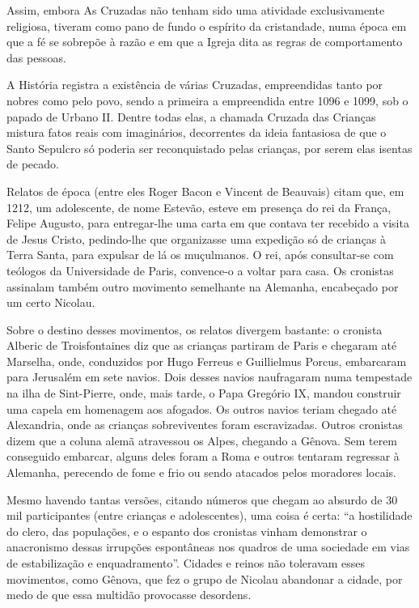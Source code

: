 \documentclass[12pt]{extarticle}
\begin{document}


Assim, embora As Cruzadas não tenham sido uma atividade exclusivamente
religiosa, tiveram como pano de fundo o espírito da cristandade, numa
época em que a fé se sobrepõe à razão e em que a Igreja dita as regras
de comportamento das pessoas.

A História registra a existência de várias Cruzadas, empreendidas tanto
por nobres como pelo povo, sendo a primeira a empreendida entre 1096 e
1099, sob o papado de Urbano II. Dentre todas elas, a chamada Cruzada
das Crianças mistura fatos reais com imaginários, decorrentes da ideia
fantasiosa de que o Santo Sepulcro só poderia ser reconquistado pelas
crianças, por serem elas isentas de pecado.




Relatos de época (entre eles Roger Bacon e Vincent de Beauvais) citam
que, em 1212, um adolescente, de nome Estevão, esteve em presença do rei
da França, Felipe Augusto, para entregar-lhe uma carta em que contava
ter recebido a visita de Jesus Cristo, pedindo-lhe que organizasse uma
expedição só de crianças à Terra Santa, para expulsar de lá os
muçulmanos. O rei, após consultar-se com teólogos da Universidade de
Paris, convence-o a voltar para casa. Os cronistas assinalam também
outro movimento semelhante na Alemanha, encabeçado por um certo
Nicolau.

Sobre o destino desses movimentos, os relatos divergem bastante: o
cronista Alberic de Troisfontaines diz que as crianças partiram de Paris
e chegaram até Marselha, onde, conduzidos por Hugo Ferreus e Guillielmus
Porcus, embarcaram para Jerusalém em sete navios. Dois desses navios
naufragaram numa tempestade na ilha de Sint-Pierre, onde, mais tarde, o
Papa Gregório IX, mandou construir uma capela em homenagem aos afogados.
Os outros navios teriam chegado até Alexandria, onde as crianças
sobreviventes foram escravizadas. Outros cronistas dizem que a coluna
alemã atravessou os Alpes, chegando a Gênova. Sem terem conseguido
embarcar, alguns deles foram a Roma e outros tentaram regressar à
Alemanha, perecendo de fome e frio ou sendo atacados pelos moradores
locais.

Mesmo havendo tantas versões, citando números que chegam ao absurdo de
30 mil participantes (entre crianças e adolescentes), uma coisa é certa:
``a hostilidade do clero, das populações, e o espanto dos cronistas
vinham demonstrar o anacronismo dessas irrupções espontâneas nos quadros
de uma sociedade em vias de estabilização e enquadramento''. Cidades e
reinos não toleravam esses movimentos, como Gênova, que fez o grupo de
Nicolau abandonar a cidade, por medo de que essa multidão provocasse
desordens.
\end{document}

